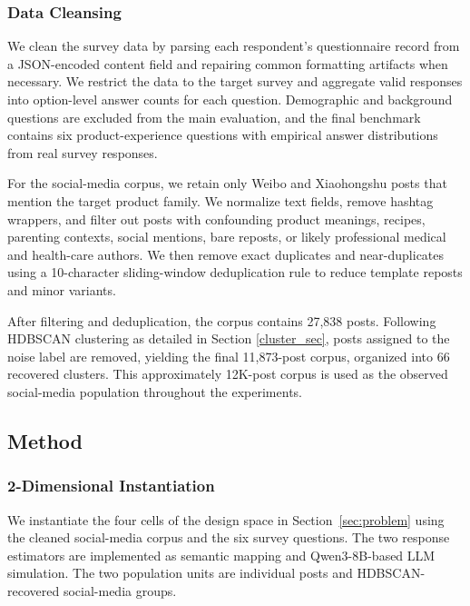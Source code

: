 \documentclass{article}
\begin{document}
\subsubsection{Data Cleansing}

We clean the survey data by parsing each respondent's questionnaire record from a JSON-encoded content field and repairing common formatting artifacts when necessary. We restrict the data to the target survey and aggregate valid responses into option-level answer counts for each question.
Demographic and background questions are excluded from the main evaluation, and the final benchmark contains six product-experience questions with empirical answer distributions from real survey responses.

For the social-media corpus, we retain only Weibo and Xiaohongshu posts that mention the target product family.
We normalize text fields, remove hashtag wrappers, and filter out posts with confounding product meanings, recipes, parenting contexts, social mentions, bare reposts, or likely professional medical and health-care authors.
We then remove exact duplicates and near-duplicates using a 10-character sliding-window deduplication rule to reduce template reposts and minor variants.

After filtering and deduplication, the corpus contains 27,838 posts. Following HDBSCAN clustering as detailed in Section \ref{cluster_sec}, posts assigned to the noise label are removed, yielding the final 11,873-post corpus, organized into 66 recovered clusters.
This approximately 12K-post corpus is used as the observed social-media population throughout the experiments.

\subsection{Method}

\subsubsection{2-Dimensional Instantiation}

We instantiate the four cells of the design space in Section~\ref{sec:problem} using the cleaned social-media corpus and the six survey questions.
The two response estimators are implemented as semantic mapping and Qwen3-8B-based LLM simulation.
The two population units are individual posts and HDBSCAN-recovered social-media groups.
\end{document}
